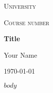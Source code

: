 \documentclass[12pt,a4paper]{scrartcl}
\date{\today}
\author{Pil Eghoff  (s164922)}
\begin{document}
\begin{titlepage}
	\centering
	{\scshape\LARGE University \par}
	\vspace{1cm}
	{\scshape\Large Course number \par}
	\vspace{1.5cm}
	{\huge\bfseries Title \par}
	\vspace{2cm}
	{\Large Your Name \par}
	\vfill

	{\large \today\par}
\end{titlepage}


\newpage

$body$
\end{document}
